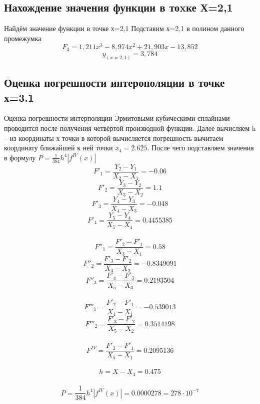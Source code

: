 \documentclass[russian,utf8,nocolumnxxxi,nocolumnxxxii]{eskdtext}
\begin{document}
\subsection{Нахождение значения функции в тоxке Х=2,1}
Найдём значение функции в точке х=2,1
Подставим х=2,1 в полином данного промежумка 
$$F_3=1,211x^3-8,974x^2+21,903x-13,852$$
$$y_{(x=2,1)}=3,784$$

\newpage

\subsection{Оценка погрешности интерополяции в точке х=3.1}

 Оценка погрешности интерполяции Эрмитовыми
кубическими сплайнами проводится после получения четвёртой производной функции. Далее вычисляем h -- из координаты х точки в которой вычисляется погрешность вычитаем координату ближайшей к ней точки $x_4=2.625$. После чего подставляем значения в формулу $P=\frac{1}{384}h^4|f^{IV}(x)|$
$$F'_1=\frac{Y_2-Y_1}{X_2-X_1}=-0.06$$
$$F'_2=\frac{Y_3-Y_2}{X_3-X_2}=1.1$$
$$F'_3=\frac{Y_4-Y_3}{X_4-X_3}=-0.048$$
$$F'_4=\frac{Y_5-Y_4}{X_5-X_4}=0.4455385$$
\
$$F''_1=\frac{F'_2-F'_1}{X_3-X_1}=0.58$$
$$F''_2=\frac{F'_3-F'_2}{X_4-X_2}=-0.8349091$$
$$F''_3=\frac{F'_4-F'_3}{X_5-X_3}=0.2193504$$ 
\
$$F'''_1=\frac{F'_2-F'_1}{X_4-X_1}=-0.539013$$
$$F'''_2=\frac{F'_3-F'_2}{X_5-X_2}= 0.3514198$$ 
\
$$F^{IV}=\frac{F'_2-F'_1}{X_5-X_1}=0.2095136$$ 
\
$$h=X-X_4=0.475$$
\
$$P=\frac{1}{384}h^4|f^{IV}(x)|= 0.0000278=278 \cdot 10^{-7}$$ 
\end{document}
